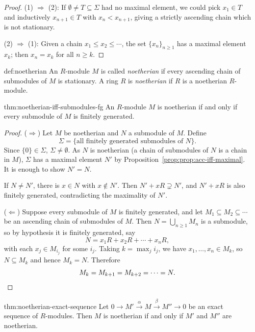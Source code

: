 \begin{proof}
(1) $\Rightarrow$ (2): If $\emptyset \neq T \subseteq \Sigma$ had no maximal element, we could pick $x_1 \in T$ and inductively $x_{n+1} \in T$ with $x_n < x_{n+1}$, giving a strictly ascending chain which is not stationary.

(2) $\Rightarrow$ (1): Given a chain $x_1 \leq x_2 \leq \cdots$, the set $\{x_n\}_{n \geq 1}$ has a maximal element $x_k$; then $x_n = x_k$ for all $n \geq k$.
\end{proof}

\begin{definition}{}{def:noetherian}
An $R$-module $M$ is called \emph{noetherian} if every ascending chain of submodules of $M$ is stationary. A ring $R$ is \emph{noetherian} if $R$ is a noetherian $R$-module.
\end{definition}

\begin{theorem}{}{thm:noetherian-iff-submodules-fg}
An $R$-module $M$ is noetherian if and only if every submodule of $M$ is finitely generated.
\end{theorem}

\begin{proof}
($\Rightarrow$) Let $M$ be noetherian and $N$ a submodule of $M$. Define
\[
\Sigma = \{\text{all finitely generated submodules of } N\}.
\]
Since $\{0\} \in \Sigma$, $\Sigma \neq \emptyset$. As $N$ is noetherian (a chain of submodules of $N$ is a chain in $M$), $\Sigma$ has a maximal element $N'$ by Proposition~\ref{prop:prop:acc-iff-maximal}. It is enough to show $N' = N$.

If $N \neq N'$, there is $x \in N$ with $x \notin N'$. Then $N' + xR \supsetneq N'$, and $N' + xR$ is also finitely generated, contradicting the maximality of $N'$.

($\Leftarrow$) Suppose every submodule of $M$ is finitely generated, and let $M_1 \subseteq M_2 \subseteq \cdots$ be an ascending chain of submodules of $M$. Then $N = \bigcup_{n \geq 1} M_n$ is a submodule, so by hypothesis it is finitely generated, say
\[
N = x_1R + x_2R + \cdots + x_nR,
\]
with each $x_j \in M_{i_j}$ for some $i_j$. Taking $k = \max_j i_j$, we have $x_1, \ldots, x_n \in M_k$, so $N \subseteq M_k$ and hence $M_k = N$. Therefore
\[
M_k = M_{k+1} = M_{k+2} = \cdots = N. \qedhere
\]
\end{proof}

\begin{theorem}{}{thm:noetherian-exact-sequence}
Let $0 \to M' \xrightarrow{\alpha} M \xrightarrow{\beta} M'' \to 0$ be an exact sequence of $R$-modules. Then $M$ is noetherian if and only if $M'$ and $M''$ are noetherian.
\end{theorem}

